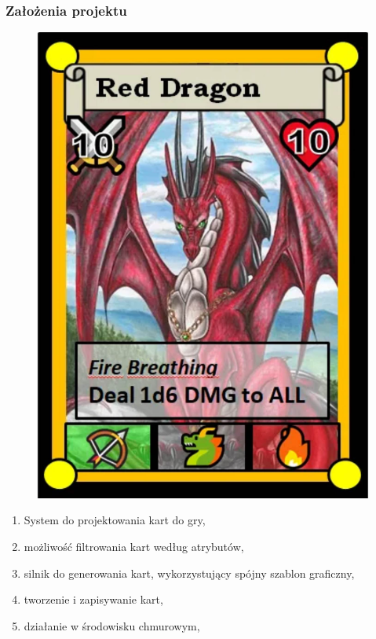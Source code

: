 \documentclass[]{beamer}
\begin{document}
\begin{frame}
\frametitle{Założenia projektu}

  \begin{multicols}{2}
  \begin{figure}
    \centering
    \includegraphics[width=0.8\linewidth]{red_dragon.jpg}
  \end{figure}

  \begin{enumerate}
    \item System do projektowania kart do gry,
    \item możliwość filtrowania kart według atrybutów,
    \item silnik do generowania kart, wykorzystujący spójny szablon graficzny,
    \item tworzenie i zapisywanie kart,
    \item działanie w środowisku chmurowym,
  \end{enumerate}
  \end{multicols}

\end{frame}
\end{document}
